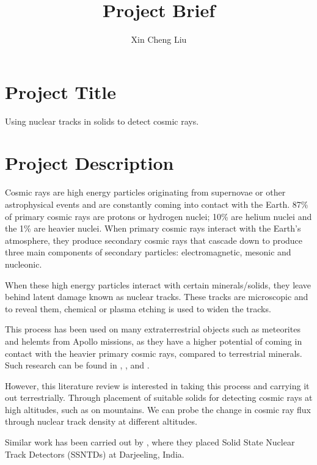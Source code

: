 \documentclass{article}
\title{Project Brief}
\author{Xin Cheng Liu}
\date{}
\begin{document}
\maketitle

\section{Project Title}
Using nuclear tracks in solids to detect cosmic rays.

\section{Project Description}
Cosmic rays are high energy particles originating from supernovae or other astrophysical events and are constantly
coming into contact with the Earth. 87\% of primary cosmic rays are protons or hydrogen nuclei; 10\% are helium 
nuclei and the 1\% are heavier nuclei\cite{dunai2010cosmogenic}. When primary cosmic rays interact with the Earth's
atmosphere, they produce secondary cosmic rays that cascade down to produce three main components of secondary 
particles: electromagnetic, mesonic and nucleonic. 

When these high energy particles interact with certain minerals/solids, they leave behind latent damage known as
nuclear tracks. These tracks are microscopic and to reveal them, chemical or plasma etching is used to widen the 
tracks. 

This process has been used on many extraterrestrial objects such as meteorites and helemts from Apollo missions, 
as they have a higher potential of coming in contact with the heavier primary cosmic rays, compared to terrestrial 
minerals. Such research can be found in \cite{fleischer1967tracks}, \cite{aleksandrov2011meteorites}, \cite{bull1976cosmic}
and \cite{comstock1971cosmic}.

However, this literature review is interested in taking this process and carrying it out terrestrially. Through
placement of suitable solids for detecting cosmic rays at high altitudes, such as on mountains. We can probe the 
change in cosmic ray flux through nuclear track density at different altitudes. 

Similar work has been carried out by \cite{basu2015observation}, where they placed Solid State Nuclear Track
Detectors (SSNTDs) at Darjeeling, India. 



\end{document}
